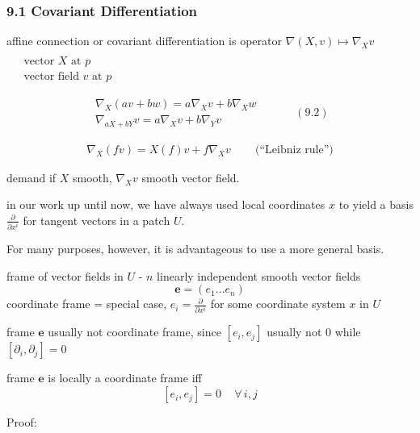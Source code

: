 \subsubsection{9.1 Covariant Differentiation}

\begin{definition}
affine connection or covariant differentiation is operator $\nabla (X,v) \mapsto \nabla_X v$ \quad \, $\begin{aligned} & \quad \\ 
       & \text{ vector $X$ at $p$ } \\ 
       & \text{ vector field $v$ at $p$ } \end{aligned}$

\begin{equation} 
\begin{gathered}
\nabla_X (av+ bw) = a\nabla_X v + b \nabla_X w \\ 
         \nabla_{ aX + bY} v = a\nabla_X v + b\nabla_Y v
\end{gathered} \quad \quad \quad (9.2)
\end{equation}

\[
\begin{gathered}
\nabla_X (fv) = X(f)v + f\nabla_X v  \quad \quad \, \text{(``Leibniz rule'')}
\end{gathered}
\]

demand if $X$ smooth, $\nabla_X v$ smooth vector field. 
\end{definition}

in our work up until now, we have always used local coordinates $x$ to yield a basis $\frac{ \partial}{ \partial x^i}$ for tangent vectors in a patch $U$.  

For many purposes, however, it is advantageous to use a more general basis.

frame of vector fields in $U$ - $n$ linearly independent smooth vector fields
\[
\mathbf{e} = (e_1 \dots e_n)
\]
coordinate frame = special case, $e_i = \frac{ \partial }{ \partial x^i}$ for some coordinate system $x$ in $U$

frame $\mathbf{e}$ usually not coordinate frame, since $[e_i, e_j]$ usually not 0 while $[\partial_i, \partial_j] =0$

\begin{theorem}[9.3] frame $\mathbf{e}$ is locally a coordinate frame iff
\[
[e_i , e_j] = 0 \quad \, \forall \, i,j
\]
\end{theorem}

Proof: 

